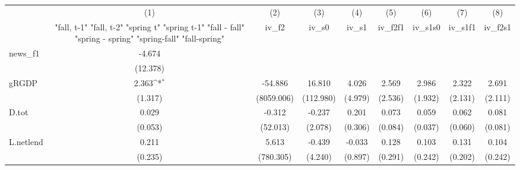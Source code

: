 {
\def\sym#1{\ifmmode^{#1}\else\(^{#1}\)\fi}
\begin{tabular}{l*{8}{c}}
\toprule
            &\multicolumn{1}{c}{(1)}&\multicolumn{1}{c}{(2)}&\multicolumn{1}{c}{(3)}&\multicolumn{1}{c}{(4)}&\multicolumn{1}{c}{(5)}&\multicolumn{1}{c}{(6)}&\multicolumn{1}{c}{(7)}&\multicolumn{1}{c}{(8)}\\
            &\multicolumn{1}{c}{  "fall, t-1" "fall, t-2" "spring t" "spring t-1"  "fall - fall" "spring - spring" "spring-fall" "fall-spring" }&\multicolumn{1}{c}{iv\_f2}&\multicolumn{1}{c}{iv\_s0}&\multicolumn{1}{c}{iv\_s1}&\multicolumn{1}{c}{iv\_f2f1}&\multicolumn{1}{c}{iv\_s1s0}&\multicolumn{1}{c}{iv\_s1f1}&\multicolumn{1}{c}{iv\_f2s1}\\
\midrule
news\_f1     &      -4.674         &                     &                     &                     &                     &                     &                     &                     \\
            &    (12.378)         &                     &                     &                     &                     &                     &                     &                     \\
\addlinespace
gRGDP       &       2.363\sym{*}  &     -54.886         &      16.810         &       4.026         &       2.569         &       2.986         &       2.322         &       2.691         \\
            &     (1.317)         &  (8059.006)         &   (112.980)         &     (4.979)         &     (2.536)         &     (1.932)         &     (2.131)         &     (2.111)         \\
\addlinespace
D.tot       &       0.029         &      -0.312         &      -0.237         &       0.201         &       0.073         &       0.059         &       0.062         &       0.081         \\
            &     (0.053)         &    (52.013)         &     (2.078)         &     (0.306)         &     (0.084)         &     (0.037)         &     (0.060)         &     (0.081)         \\
\addlinespace
L.netlend   &       0.211         &       5.613         &      -0.439         &      -0.033         &       0.128         &       0.103         &       0.131         &       0.104         \\
            &     (0.235)         &   (780.305)         &     (4.240)         &     (0.897)         &     (0.291)         &     (0.242)         &     (0.202)         &     (0.242)         \\

\end{tabular}}
